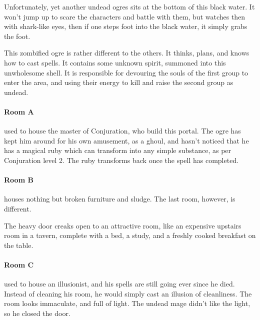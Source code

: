 \begin{multicols}{2}
Unfortunately, yet another undead ogres sits at the bottom of this black water.  It won't jump up to scare the characters and battle with them, but watches then with shark-like eyes, then if one steps foot into the black water, it simply grabs the foot.

This zombified ogre is rather different to the others.  It thinks, plans, and knows how to cast spells.  It contains some unknown spirit, summoned into this unwholesome shell.  It is responsible for devouring the souls of the first group to enter the area, and using their energy to kill and raise the second group as undead.

\label{undead_ogre}

\paragraph{Room A} used to house the master of Conjuration, who build this portal.  The ogre has kept him around for his own amusement, as a ghoul, and hasn't noticed that he has a magical ruby which can transform into any simple substance, as per Conjuration level 2.  The ruby transforms back once the spell has completed.


\paragraph{Room B} houses nothing but broken furniture and sludge.  The last room, however, is different.

\begin{boxtext}
	The heavy door creaks open to an attractive room, like an expensive upstairs room in a tavern, complete with a bed, a study, and a freshly cooked breakfast on the table.
\end{boxtext}

\paragraph{Room C} used to house an illusionist, and his spells are still going ever since he died.  Instead of cleaning his room, he would simply cast an illusion of cleanliness.  The room looks immaculate, and full of light.  The undead mage didn't like the light, so he closed the door.


\end{multicols}
